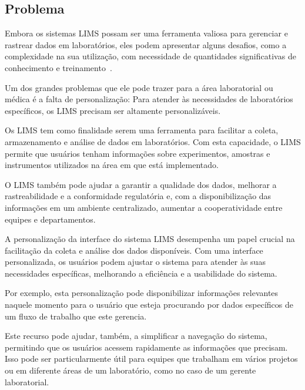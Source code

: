 \subsection{Problema}

Embora os sistemas LIMS possam ser uma ferramenta valiosa para gerenciar e rastrear dados em laboratórios, eles podem apresentar alguns desafios, como a complexidade na sua utilização, com necessidade de quantidades significativas de conhecimento e treinamento~\cite{Avery2000ProductGuide.}.

Um dos grandes problemas que ele pode trazer para a área laboratorial ou médica é a falta de personalização: Para atender às necessidades de laboratórios específicos, os LIMS precisam ser altamente personalizáveis.

Os LIMS tem como finalidade serem uma ferramenta para facilitar a coleta, armazenamento e análise de dados em laboratórios. Com esta capacidade, o LIMS permite que usuários tenham informações sobre experimentos, amostras e instrumentos utilizados na área em que está implementado.

O LIMS também pode ajudar a garantir a qualidade dos dados, melhorar a rastreabilidade e a conformidade regulatória e, com a disponibilização das informações em um ambiente centralizado, aumentar a cooperatividade entre equipes e departamentos.

A personalização da interface do sistema LIMS desempenha um papel crucial na facilitação da coleta e análise dos dados disponíveis. Com uma interface personalizada, os usuários podem ajustar o sistema para atender às suas necessidades específicas, melhorando a eficiência e a usabilidade do sistema.

Por exemplo, esta personalização pode disponibilizar informações relevantes naquele momento para o usuário que esteja procurando por dados específicos de um fluxo de trabalho que este gerencia.

Este recurso pode ajudar, também, a simplificar a navegação do sistema, permitindo que os usuários acessem rapidamente as informações que precisam. Isso pode ser particularmente útil para equipes que trabalham em vários projetos ou em diferente áreas de um laboratório, como no caso de um gerente laboratorial.